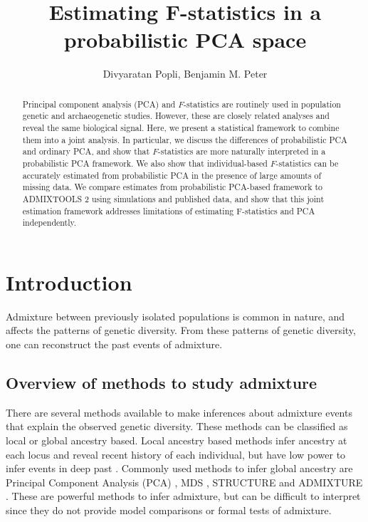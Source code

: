 \documentclass[12pt, letterpaper]{article}
\title{Estimating F-statistics in a probabilistic PCA space}
\author{Divyaratan Popli, Benjamin M. Peter}
\begin{document}
\maketitle


\begin{abstract}

\noindent Principal component analysis (PCA) and $F$-statistics are routinely used in population genetic and archaeogenetic studies. However, these are closely related analyses and reveal the same biological signal. Here, we present a statistical framework to combine them into a joint analysis. In particular, we discuss the differences of probabilistic PCA and ordinary PCA, and show that $F$-statistics are more naturally interpreted in a probabilistic PCA framework. We also show that individual-based $F$-statistics can be accurately estimated from probabilistic PCA in the presence of large amounts of missing data. We compare estimates from probabilistic PCA-based framework to ADMIXTOOLS 2 using simulations and published data, and show that this joint estimation framework addresses limitations of estimating F-statistics and PCA independently.

\end{abstract}

\section{Introduction}

Admixture between previously isolated populations is common in nature, and affects the patterns of genetic diversity. From these patterns of genetic diversity, one can reconstruct the past events of admixture.  

\subsection{Overview of methods to study admixture}
There are several methods available to make inferences about admixture events that explain the observed genetic diversity. These methods can be classified as local or global ancestry based. Local ancestry based methods infer ancestry at each locus and reveal recent history of each individual, but have low power to infer events in deep past \cite{vi_genome-wide_2023, brisbin_pcadmix_2012, price_sensitive_2009, sankararaman_estimating_2008}. Commonly used methods to infer global ancestry are Principal Component Analysis (PCA) \cite{mcvean_genealogical_2009}, MDS \cite{wang_comparison_2009}, STRUCTURE \cite{pritchard_inference_2000} and ADMIXTURE \cite{alexander_fast_2009}. These are powerful methods to infer admixture, but can be difficult to interpret since they do not provide model comparisons or formal tests of admixture.  
\end{document}

